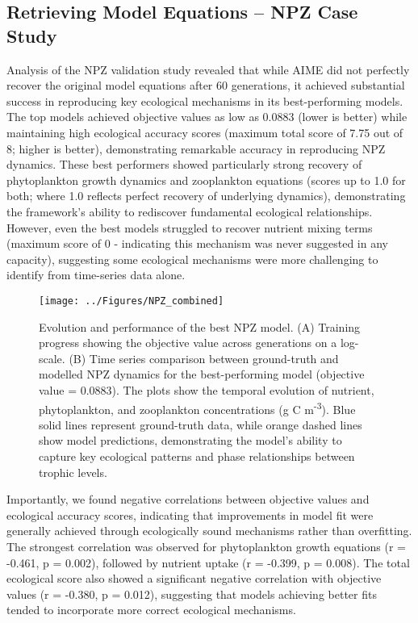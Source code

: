 \subsection{Retrieving Model Equations -- NPZ Case Study}

Analysis of the NPZ validation study revealed that while AIME did not perfectly recover the original model equations after 60 generations, it achieved substantial success in reproducing key ecological mechanisms in its best-performing models. The top models achieved objective values as low as 0.0883 (lower is better) while maintaining high ecological accuracy scores (maximum total score of 7.75 out of 8; higher is better), demonstrating remarkable accuracy in reproducing NPZ dynamics. These best performers showed particularly strong recovery of phytoplankton growth dynamics and zooplankton equations (scores up to 1.0 for both; where 1.0 reflects perfect recovery of underlying dynamics), demonstrating the framework's ability to rediscover fundamental ecological relationships. However, even the best models struggled to recover nutrient mixing terms (maximum score of 0 - indicating this mechanism was never suggested in any capacity), suggesting some ecological mechanisms were more challenging to identify from time-series data alone.

\begin{figure}[H]
\centering
\texttt{[image: ../Figures/NPZ\_combined]}
\caption{Evolution and performance of the best NPZ model. (A) Training progress showing the objective value across generations on a log-scale. (B) Time series comparison between ground-truth and modelled NPZ dynamics for the best-performing model (objective value = 0.0883). The plots show the temporal evolution of nutrient, phytoplankton, and zooplankton concentrations (g C m\textsuperscript{-3}). Blue solid lines represent ground-truth data, while orange dashed lines show model predictions, demonstrating the model's ability to capture key ecological patterns and phase relationships between trophic levels.}
\label{fig:npz_timeseries}
\end{figure}

Importantly, we found negative correlations between objective values and ecological accuracy scores, indicating that improvements in model fit were generally achieved through ecologically sound mechanisms rather than overfitting. The strongest correlation was observed for phytoplankton growth equations (r = -0.461, p = 0.002), followed by nutrient uptake (r = -0.399, p = 0.008). The total ecological score also showed a significant negative correlation with objective values (r = -0.380, p = 0.012), suggesting that models achieving better fits tended to incorporate more correct ecological mechanisms.

